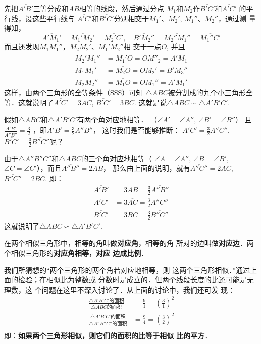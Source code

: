 先把$\overline{A'B'}$三等分成和$\overline{AB}$相等的线段，然后通过分点
${M_1}$和$M_2$作$\overline{B'C'}$和$\overline{A'C'}$
的平行线，设这些平行线与
$\overline{A'C'}$和$\overline{B'C'}$分别相交于$M_1'$、$M_2'$, $M_1''$、$M_2''$，通过测
量得知，
\[\overline{A'M_1'}=\overline{M_1'M_2'}=\overline{M_2'C'},\quad \overline{B'M_2''}=\overline{M_2''M_1''}
=\overline{M_1''C'}\]
而且还发现$\overline{M_1M_1''}$，$\overline{M_2M_2'}$、$\overline{M_1'M_2''}$相
交于一点$O$, 并且
\[\begin{split}
	\overline{M_2'M_1''}&=\overline{M_1'O}=\overline{OM''_2}=\overline{A'M_1}\\
	\overline{M_1M_1'}&=\overline{M_2O}=\overline{OM_2'}=\overline{B'M_3''}\\
	\overline{M_2M_2''}&=\overline{M_1O}=\overline{OM_1''}=\overline{A'M_1'}
\end{split}\]
这样，由两个三角形的全等条件（SSS）可知
$\triangle ABC$被分割成的九个小三角形全等．这就说明了$\overline{A'C'}=3\overline{AC}$, $\overline{B'C'}=3\overline{BC}$. 这就是说$\triangle ABC\backsim \triangle A'B'C'$.

假如$\triangle ABC$和$\triangle A'B'C'$有两个角对应地相等．
（$\angle A'=\angle A''$, $\angle B'=\angle B''$）
且$\frac{\overline{A'B'}}{\overline{A''B''}}=\frac{3}{2}$
，即$\overline{A'B'}=\frac{3}{2}\overline{A''B''}$，
这时我们是否能够推断：
$\overline{A'C'}=\frac{3}{2}\overline{A''C''}$, $\overline{B'C'}=\frac{3}{2}\overline{B''C''}$呢？

由于$\triangle A''B''C''$和$\triangle ABC$的三个角对应地相等（
$\angle A=\angle A''$, $\angle B=\angle B'$, $\angle C=\angle C'$），而且$\overline{A''B''}=2\overline{AB}$，
那么由上面的说明，就有$\overline{A''C''}=2\overline{AC}$, $\overline{B''C''}=2\overline{BC}$. 
即：
\[\begin{split}
	\overline{A'B'}&=3\overline{AB}=\frac{3}{2}\overline{A''B''}\\
	\overline{A'C'}&=3\overline{AC}=\frac{3}{2}\overline{A''C''}\\
 \overline{B'C'}&=3\overline{BC}=\frac{3}{2}\overline{B''C''}
\end{split}
	\]
这就说明了$\triangle ABC\backsim \triangle A'B'C'$.

在两个相似三角形中，相等的角叫做\textbf{对应角}，相等的角
所对的边叫做\textbf{对应边}．两个相似三角形的\textbf{对应角相等，对应
边成比例}．

我们所猜想的“两个三角形的两个角若对应地相等，则
这两个三角形相似．”通过上面的检验；在相似比为整数或
分数时是成立的．但两个线段长度的比还可能是无理数，这
个问题在这里不深入讨论了．从上面的讨论中，我们还可发
现：
\[\begin{split}
	\frac{\triangle A'B'C'\text{的面积} }{\triangle ABC\text{的面积}}&=\frac{9}{1}=\left(\frac{3}{1}\right)^2\\
	\frac{\triangle A'B'C'\text{的面积} }{\triangle A''B''C''\text{的面积}}&=\frac{9}{4}=\left(\frac{3}{2}\right)^2\\
\end{split}\]
即：\textbf{如果两个三角形相似，则它们的面积的比等于相似
比的平方}．


